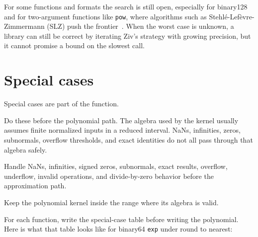 \documentclass[manuscript, nonacm]{acmart}
\begin{document}
    For some functions and formats the search is still open, especially for
    binary128 and for two-argument functions like \texttt{pow}, where
    algorithms such as Stehlé-Lefèvre-Zimmermann (SLZ) push the frontier~\cite{muller,handbook}. When
    the worst case is unknown, a library can still be correct by iterating
    Ziv's strategy with growing precision, but it cannot promise a bound on
    the slowest call.



    \section{Special cases}

    Special cases are part of the function.

    Do these before the polynomial path. The algebra used by the kernel usually
    assumes finite normalized inputs in a reduced interval. NaNs, infinities,
    zeros, subnormals, overflow thresholds, and exact identities do not all pass
    through that algebra safely.

    Handle NaNs, infinities, signed zeros, subnormals, exact results, overflow,
    underflow, invalid operations, and divide-by-zero behavior before the
    approximation path.

    Keep the polynomial kernel inside the range where its algebra is valid.

    For each function, write the special-case table before writing the
    polynomial. Here is what that table looks like for binary64 \texttt{exp}
    under round to nearest:
\end{document}
